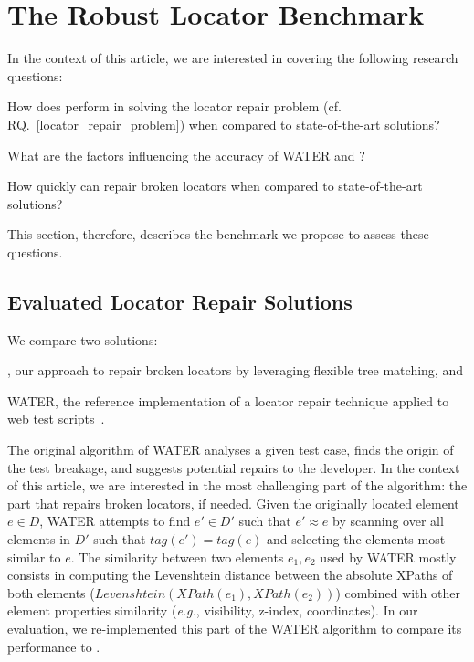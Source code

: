 \section{The Robust Locator Benchmark}\label{sec:benchmark}
In the context of this article, we are interested in covering the following research questions:
\begin{rqn}\label{rq:performance}
    How does \erratum{} perform in solving the locator repair problem (cf. RQ.~\ref{locator_repair_problem}) when compared to state-of-the-art solutions?
\end{rqn}
\begin{rqn}\label{rq:influenceFactors}
    What are the factors influencing the accuracy of WATER and \erratum?
\end{rqn}
\begin{rqn}\label{rq:computationTime}
    How quickly can \erratum{} repair broken locators when compared to state-of-the-art solutions?
\end{rqn}
This section, therefore, describes the benchmark we propose to assess these questions.

\subsection{Evaluated Locator Repair Solutions}\label{sec:consideredSolutions}
We compare two solutions: 
\begin{inparaenum}
    \item \erratum{}, our approach to repair broken locators by leveraging flexible tree matching, and
    \item WATER, the reference implementation of a locator repair technique applied to web test scripts~\cite{choudhary2011water}.
\end{inparaenum}

The original algorithm of WATER analyses a given test case, finds the origin of the test breakage, and suggests potential repairs to the developer.
In the context of this article, we are interested in the most challenging part of the algorithm: the part that repairs broken locators, if needed.
Given the originally located element $e \in D$, WATER attempts to find $e' \in D'$ such that $e' \approx e$ by scanning over all elements in $D'$ such that $tag(e') = tag(e)$ and selecting the elements most similar to $e$. 
The similarity between two elements $e_1, e_2$ used by WATER mostly consists in computing the Levenshtein distance between the absolute XPaths of both elements ($Levenshtein(XPath(e_1), XPath(e_2))$) combined with other element properties similarity (\emph{e.g.}, visibility, z-index, coordinates).
In our evaluation, we re-implemented this part of the WATER algorithm to compare its performance to \erratum{}.

